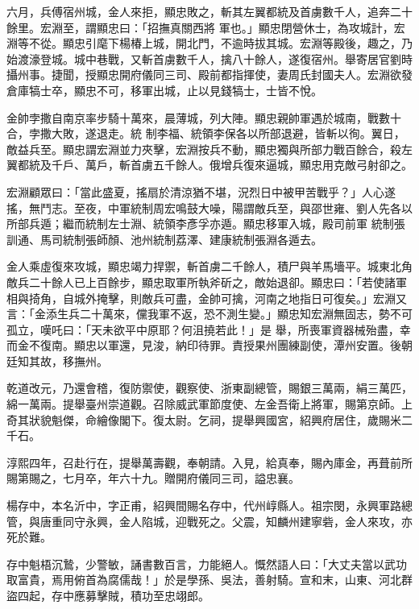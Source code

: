 \begin{pinyinscope}
 六月，兵傅宿州城，金人來拒，顯忠敗之，斬其左翼都統及首虜數千人，追奔二十餘里。宏淵至，謂顯忠曰：「招撫真關西將
 軍也。」顯忠閉營休士，為攻城計，宏淵等不從。顯忠引麾下楊椿上城，開北門，不逾時拔其城。宏淵等殿後，趣之，乃始渡濠登城。城中巷戰，又斬首虜數千人，擒八十餘人，遂復宿州。舉寄居官劉時攝州事。捷聞，授顯忠開府儀同三司、殿前都指揮使，妻周氏封國夫人。宏淵欲發倉庫犒士卒，顯忠不可，移軍出城，止以見錢犒士，士皆不悅。



 金帥孛撒自南京率步騎十萬來，晨薄城，列大陣。顯忠親帥軍遇於城南，戰數十合，孛撒大敗，遂退走。統
 制李福、統領李保各以所部退避，皆斬以徇。翼日，敵益兵至。顯忠謂宏淵並力夾擊，宏淵按兵不動，顯忠獨與所部力戰百餘合，殺左翼都統及千戶、萬戶，斬首虜五千餘人。俄增兵復來逼城，顯忠用克敵弓射卻之。



 宏淵顧眾曰：「當此盛夏，搖扇於清涼猶不堪，況烈日中被甲苦戰乎？」人心遂搖，無鬥志。至夜，中軍統制周宏鳴鼓大噪，陽謂敵兵至，與邵世雍、劉人先各以所部兵遁；繼而統制左士淵、統領李彥孚亦遁。顯忠移軍入城，殿司前軍
 統制張訓通、馬司統制張師顏、池州統制荔澤、建康統制張淵各遁去。



 金人乘虛復來攻城，顯忠竭力捍禦，斬首虜二千餘人，積尸與羊馬墻平。城東北角敵兵二十餘人已上百餘步，顯忠取軍所執斧斫之，敵始退卻。顯忠曰：「若使諸軍相與掎角，自城外掩擊，則敵兵可盡，金帥可擒，河南之地指日可復矣。」宏淵又言：「金添生兵二十萬來，儻我軍不返，恐不測生變。」顯忠知宏淵無固志，勢不可孤立，嘆吒曰：「天未欲平中原耶？何沮撓若此！」是
 舉，所喪軍資器械殆盡，幸而金不復南。顯忠以軍還，見浚，納印待罪。責授果州團練副使，潭州安置。後朝廷知其故，移撫州。



 乾道改元，乃還會稽，復防禦使，觀察使、浙東副總管，賜銀三萬兩，絹三萬匹，綿一萬兩。提舉臺州崇道觀。召除威武軍節度使、左金吾衛上將軍，賜第京師。上奇其狀貌魁傑，命繪像閣下。復太尉。乞祠，提舉興國宮，紹興府居住，歲賜米二千石。



 淳熙四年，召赴行在，提舉萬壽觀，奉朝請。入見，給真奉，賜內庫金，再葺前所
 賜第賜之，七月卒，年六十九。贈開府儀同三司，謚忠襄。



 楊存中，本名沂中，字正甫，紹興間賜名存中，代州崞縣人。祖宗閔，永興軍路總管，與唐重同守永興，金人陷城，迎戰死之。父震，知麟州建寧砦，金人來攻，亦死於難。



 存中魁梧沉鷙，少警敏，誦書數百言，力能絕人。慨然語人曰：「大丈夫當以武功取富貴，焉用俯首為腐儒哉！」於是學孫、吳法，善射騎。宣和末，山東、河北群盜四起，存中應募擊賊，積功至忠翊郎。




\end{pinyinscope}
